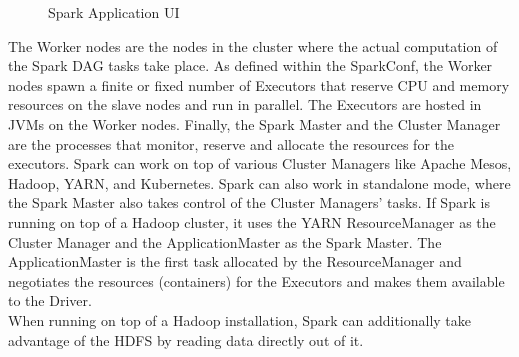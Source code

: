 \begin{figure}[htbp]
	\captionsetup[subfigure]{justification=centering}
	\centering
	\caption{Spark Application UI}
	\label{appui}
\end{figure}
\FloatBarrier

\noindent The Worker nodes are the nodes in the cluster where the actual computation of the Spark DAG tasks take place. As defined within the SparkConf, the Worker nodes spawn a finite or fixed number of Executors that reserve CPU and memory resources on the slave nodes and run in parallel. The Executors are hosted in JVMs on the Worker nodes. Finally, the Spark Master and the Cluster Manager are the processes that monitor, reserve and allocate the resources for the executors. Spark can work on top of various Cluster Managers like Apache Mesos, Hadoop, YARN, and Kubernetes. Spark can also work in standalone mode, where the Spark Master also takes control of the Cluster Managers' tasks. If Spark is running on top of a Hadoop cluster, it uses the YARN ResourceManager as the Cluster Manager and the ApplicationMaster as the Spark Master. The ApplicationMaster is the first task allocated by the ResourceManager and negotiates the resources (containers) for the Executors and makes them available to the Driver. \cite[pp. 49 ff]{sparkbook1}\\
When running on top of a Hadoop installation, Spark can additionally take advantage of the HDFS by reading data directly out of it.\\

